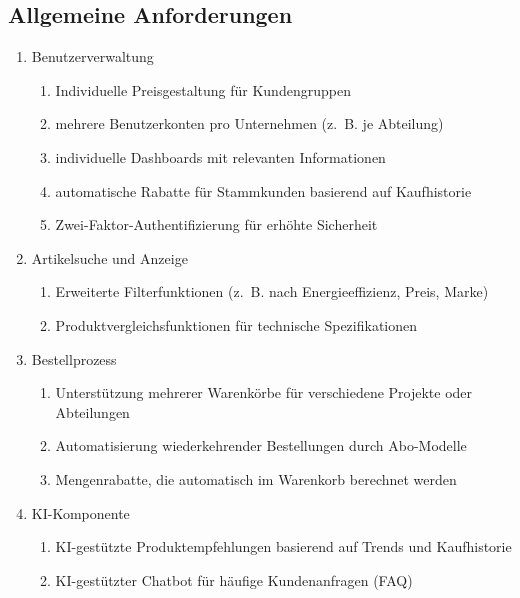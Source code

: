 \documentclass[%
	ngerman,
	12pt,
	a4paper
]{scrbook}
\begin{document}
	\subsection{Allgemeine Anforderungen}
	\begin{enumerate}
		\item Benutzerverwaltung
		\begin{enumerate}
			\item Individuelle Preisgestaltung für Kundengruppen
			\item mehrere Benutzerkonten pro Unternehmen (z.~B. je Abteilung)
			\item individuelle Dashboards mit relevanten Informationen
			\item automatische Rabatte für Stammkunden basierend auf Kaufhistorie
			\item Zwei-Faktor-Authentifizierung für erhöhte Sicherheit
		\end{enumerate}
		\item Artikelsuche und Anzeige
		\begin{enumerate}
			\item Erweiterte Filterfunktionen (z.~B. nach Energieeffizienz, Preis, Marke)
			\item Produktvergleichsfunktionen für technische Spezifikationen
		\end{enumerate}
		\item Bestellprozess
		\begin{enumerate}
			\item Unterstützung mehrerer Warenkörbe für verschiedene Projekte oder Abteilungen
			\item Automatisierung wiederkehrender Bestellungen durch Abo-Modelle
			\item Mengenrabatte, die automatisch im Warenkorb berechnet werden
		\end{enumerate}
		\item KI-Komponente
		\begin{enumerate}
			\item KI-gestützte Produktempfehlungen basierend auf Trends und Kaufhistorie
			\item KI-gestützter Chatbot für häufige Kundenanfragen (FAQ)
		\end{enumerate}
	\end{enumerate}
\end{document}
